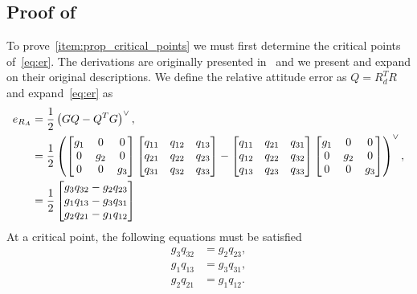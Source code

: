 \subsection{Proof of~}\label{proof:prop_critical_points}
To prove~\cref{item:prop_critical_points} we must first determine the critical points of~\cref{eq:er}.
The derivations are originally presented in~\cite{bullo2004,chaturvedi2011a} and we present and expand on their original descriptions.
We define the relative attitude error as \( Q = R_d^T R \) and expand~\cref{eq:er} as
\begin{align*}
    e_{R_A} &= \frac{1}{2} \parenth{G Q - Q^T G} ^ \vee, \\
            &= \frac{1}{2} \parenth{%
            \begin{bmatrix} g_1 & 0 & 0 \\ 0 & g_2 & 0 \\ 0 & 0 & g_3 \end{bmatrix}
            \begin{bmatrix} q_{11} & q_{12} & q_{13} \\ q_{21} & q_{22} & q_{23} \\ q_{31} & q_{32} & q_{33}\end{bmatrix}
            -
            \begin{bmatrix} q_{11} & q_{21} & q_{31} \\ q_{12} & q_{22} & q_{32} \\ q_{13} & q_{23} & q_{33}\end{bmatrix}
            \begin{bmatrix} g_1 & 0 & 0 \\ 0 & g_2 & 0 \\ 0 & 0 & g_3 \end{bmatrix}
            }^\vee , \\
            &= \frac{1}{2} \begin{bmatrix} g_3 q_{32} - g_2 q_{23} \\ g_1 q_{13} - g_3 q_{31} \\ g_2 q_{21} - g_1 q_{12}\end{bmatrix}
\end{align*}
At a critical point, the following equations must be satisfied
\begin{subequations}\label{eq:erA_critical_conditons}
    \begin{align}
        g_3q_{32} &= g_2 q_{23}, \\
        g_1 q_{13} &= g_3 q_{31}, \\
        g_2 q_{21} &= g_1 q_{12}.
    \end{align}
\end{subequations}     
